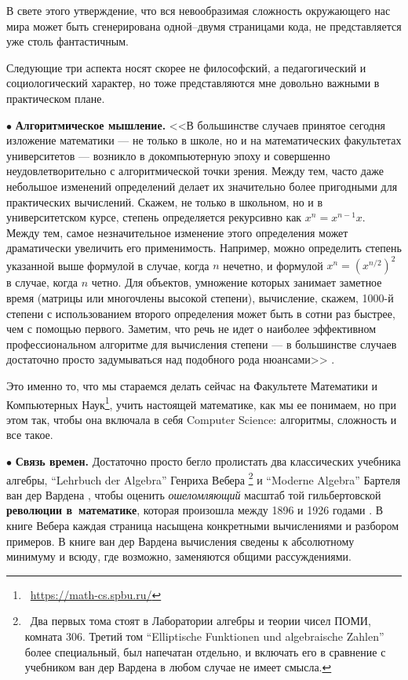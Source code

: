 \documentclass[intlimits,twoside,a4paper,11pt]{article}
\begin{document}
		В свете этого утверждение, что вся невообразимая сложность окружающего нас мира
		может быть сгенерирована одной--двумя страницами кода, не представляется уже 
		столь фантастичным.
		\par\smallskip
		Следующие три аспекта носят скорее не философский, а педагогический и 
		социологический характер, но тоже представляются мне довольно важными
		в практическом плане.
		\par\smallskip
		$\bullet$ {\bf Алгоритмическое мышление.}
		<<В большинстве случаев принятое сегодня изложение математики — не
		только в школе, но и на математических факультетах университетов — 
		возникло в докомпьютерную эпоху и совершенно неудовлетворительно 
		с алгоритмической точки зрения. Между тем, часто даже небольшое
		изменений определений делает их значительно более пригодными для 
		практических вычислений. Скажем, не только в школьном, но и в 
		университетском курсе, степень определяется рекурсивно как $x^n=x^{n-1}x$. 
		Между тем,
		самое незначительное изменение этого определения может драматически
		увеличить его применимость. Например, можно определить степень 
		указанной выше формулой в случае, когда $ n $ нечетно, и формулой 
		$x^n={(x^{n/2})}^2$ в случае, когда $n$ четно. Для объектов, умножение 
		которых занимает заметное время (матрицы или многочлены высокой степени), 
		вычисление,
		скажем, 1000-й степени с использованием второго определения может быть
		в сотни раз быстрее, чем с помощью первого. Заметим, что речь не идет о
		наиболее эффективном профессиональном алгоритме для вычисления 
		степени — в большинстве случаев достаточно просто задумываться над 
		подобного рода нюансами>> \cite{VHY}.
		
		Это именно то, что мы стараемся делать сейчас на Факультете Математики и 
		Компьютерных Наук\footnote{~\url{https://math-cs.spbu.ru/}}, учить настоящей 
		математике, как мы ее понимаем, но при этом так, чтобы она включала в себя 
		Computer Science: алгоритмы, сложность и все такое.
		
		\par\smallskip
		$\bullet$ {\bf Связь времен.} 
		Достаточно просто бегло пролистать два классических учебника алгебры,
		``Lehrbuch der Algebra'' Генриха Вебера 
		\cite{W}\footnote{~Два первых тома стоят в Лаборатории алгебры и теории чисел ПОМИ, 
			комната 306. Третий том
			``Elliptische Funktionen und algebraische Zahlen'' более специальный, был 
			напечатан отдельно, и включать его в сравнение с учебником ван дер Вардена 
			в любом случае не имеет смысла.} 
		и ``Moderne Algebra'' Бартеля ван дер Вардена \cite{Wa},
		чтобы оценить {\it ошеломляющий\/} масштаб той гильбертовской {\bf революции в~математике}, 
		которая произошла между 1896 и 1926 годами \cite{Q}. В книге Вебера каждая 
		страница насыщена конкретными вычислениями и разбором примеров. В
		книге ван дер Вардена вычисления сведены к абсолютному минимуму и всюду,
		где возможно, заменяются общими рассуждениями.
		
\end{document}
